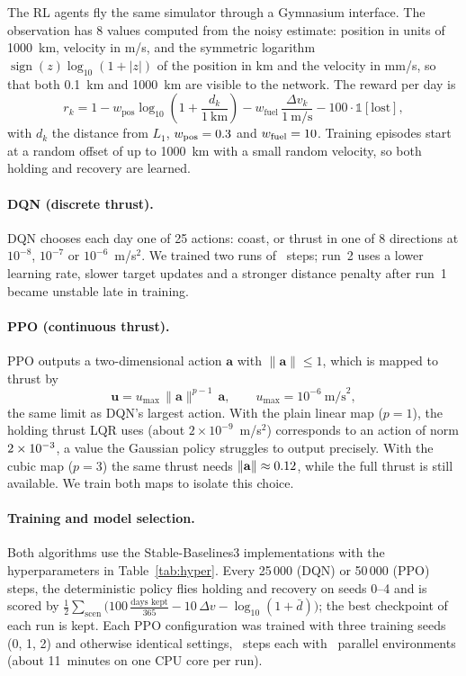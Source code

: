 \documentclass[11pt,a4paper]{article}
\newcommand{\dv}{\Delta v}
\begin{document}
The RL agents fly the same simulator through a Gymnasium interface. The
observation has 8 values computed from the noisy estimate: position in units of
1000~km, velocity in m/s, and the symmetric logarithm
$\operatorname{sign}(z)\log_{10}(1 + |z|)$ of the position in km and the
velocity in mm/s, so that both 0.1~km and 1000~km are visible to the network.
The reward per day is
\begin{equation}
r_k = 1 - w_\text{pos}\log_{10}\!\left(1 + \frac{d_k}{1~\text{km}}\right)
- w_\text{fuel}\,\frac{\dv_k}{1~\text{m/s}} - 100\cdot\mathbb{1}[\text{lost}],
\end{equation}
with $d_k$ the distance from $L_1$, $w_\text{pos} = 0.3$ and $w_\text{fuel} =
10$. Training episodes start at a random offset of up to 1000~km with a
small random velocity, so both holding and recovery are learned.

\paragraph{DQN (discrete thrust).}
DQN \cite{mnih2015} chooses each day one of 25 actions: coast, or thrust in one
of 8 directions at $10^{-8}$, $10^{-7}$ or $10^{-6}$~m/s$^2$. We trained two
runs of \dqnSteps\ steps; run~2 uses a lower learning rate, slower target
updates and a stronger distance penalty after run~1 became unstable late in
training.

\paragraph{PPO (continuous thrust).}
PPO \cite{schulman2017} outputs a two-dimensional action $\mathbf{a}$ with
$\lVert\mathbf{a}\rVert \leq 1$, which is mapped to thrust by
\begin{equation}
\mathbf{u} = u_\text{max}\,\lVert\mathbf{a}\rVert^{p-1}\,\mathbf{a},
\qquad u_\text{max} = 10^{-6}~\text{m/s}^2,
\label{eq:actionmap}
\end{equation}
the same limit as DQN's largest action. With the plain linear map ($p = 1$),
the holding thrust LQR uses (about $2\times10^{-9}$~m/s$^2$) corresponds to an
action of norm $2\times10^{-3}$, a value the Gaussian policy struggles to
output precisely. With the cubic map ($p = 3$) the same thrust needs
$\lVert\mathbf{a}\rVert \approx 0.12$, while the full thrust is
still available. We train both maps to isolate this choice.

\paragraph{Training and model selection.}
Both algorithms use the Stable-Baselines3 implementations \cite{raffin2021}
with the hyperparameters in Table~\ref{tab:hyper}. Every 25\,000 (DQN) or
50\,000 (PPO) steps, the deterministic policy flies holding and recovery on
seeds 0--4 and is scored by
$\frac{1}{2}\sum_\text{scen} \bigl(100\,\tfrac{\text{days kept}}{365} -
10\,\dv - \log_{10}(1 + \bar{d})\bigr)$; the best checkpoint of each run is
kept. Each PPO configuration was trained with three training seeds (0, 1, 2)
and otherwise identical settings, \ppoSteps\ steps each with \ppoEnvs\ parallel
environments (about 11~minutes on one CPU core per run).
\end{document}
